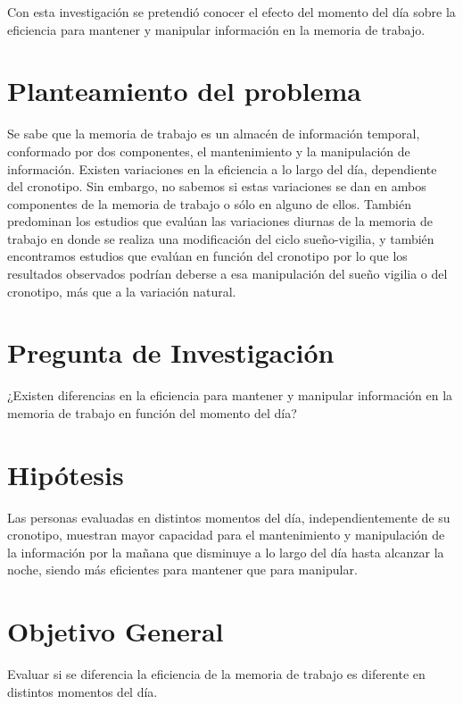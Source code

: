 \documentclass[12pt,letterpaper,final]{article}
\begin{document}
Con esta investigación se pretendió conocer el efecto del momento del día sobre la eficiencia para mantener y manipular información en la memoria de trabajo.

\section{Planteamiento del problema}
Se sabe que la memoria de trabajo es un almacén de información temporal, conformado por dos componentes, el  mantenimiento y la manipulación de información. Existen variaciones en la eficiencia a lo largo del día, dependiente del cronotipo. Sin embargo, no sabemos si estas variaciones se dan en ambos componentes de la memoria de trabajo o sólo en alguno de ellos. También predominan los estudios que evalúan las variaciones diurnas de la memoria de trabajo en donde se realiza una modificación del ciclo sueño-vigilia, y también encontramos estudios que evalúan en función del cronotipo por lo que los resultados observados podrían deberse a esa manipulación del sueño vigilia o del cronotipo, más que a la variación natural. %

\section{Pregunta de Investigación}
¿Existen diferencias en la eficiencia para mantener y manipular información en la memoria de trabajo en función del momento del día?

\section{Hipótesis}
Las personas evaluadas en distintos momentos del día, independientemente de su cronotipo, muestran mayor capacidad para el mantenimiento y manipulación de la información por la mañana que disminuye a lo largo del día hasta alcanzar la noche, siendo más eficientes para mantener que para manipular.

\section{Objetivo General}
Evaluar si se diferencia la eficiencia de la memoria de trabajo es diferente en distintos momentos del día.
\end{document}
